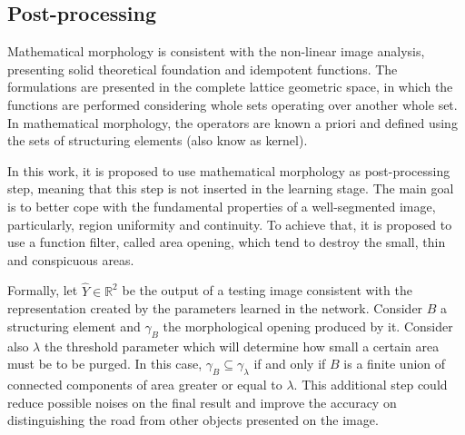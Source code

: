 \subsection{Post-processing}
\label{ssec:post_processing}
 

Mathematical morphology is consistent with the non-linear image analysis, presenting solid theoretical foundation and idempotent functions. The formulations are presented in the complete lattice geometric space, in which the functions are performed considering whole sets operating over another whole set. In mathematical morphology, the operators are known a priori and defined using the sets of structuring elements (also know as kernel).

In this work, it is proposed to use mathematical morphology as post-processing step, meaning that this step is not inserted in the learning stage. The main goal is to better cope with the fundamental properties of a well-segmented image, particularly, region uniformity and continuity. To achieve that, it is proposed to use a function filter, called area opening, which tend to destroy the small, thin and conspicuous areas.

Formally, let $\hat{Y}\in \mathbb{R}^2$ be the output of a testing image consistent with the representation created by the parameters learned in the network. Consider $B$ a structuring element and $\gamma_B$ the morphological opening produced by it. Consider also $\lambda$ the threshold parameter which will determine how small a certain area must be to be purged. In this case,  $\gamma_B \subseteq \gamma_\lambda$ if and only if $B$ is a finite union of connected components of area greater or equal to $\lambda$. This additional step could reduce possible noises on the final result and improve the accuracy on distinguishing the road from other objects presented on the image.

~\cite{najman13}
